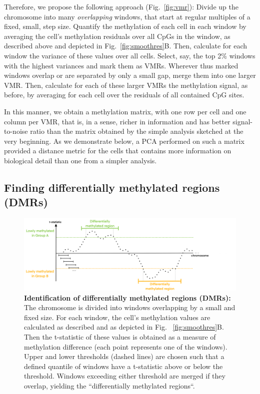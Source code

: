 \documentclass[twocolumn,10pt]{article}
\begin{document}
Therefore, we propose the following approach (Fig.~\ref{fig:vmr}): Divide up the chromosome into many \emph{overlapping} windows, that start at regular multiples of a fixed, small, step size.
Quantify the methylation of each cell in each window by averaging the cell's methylation residuals over all CpGs in the window, as described above and depicted in Fig.~\ref{fig:smoothres}B.
Then, calculate for each window the variance of these values over all cells.
Select, say, the top 2\% windows with the highest variances and mark them as VMRs.
Wherever thus marked windows overlap or are separated by only a small gap, merge them into one larger VMR.
Then, calculate for each of these larger VMRs the methylation signal, as before, by averaging for each cell over the residuals of all contained CpG sites.

In this manner, we obtain a methylation matrix, with one row per cell and one column per VMR, that is, in a sense, richer in information and has better signal-to-noise ratio than the matrix obtained by the simple analysis sketched at the very beginning.
As we demonstrate below, a PCA performed on such a matrix provided a distance metric for the cells that contains more information on biological detail than one from a simpler analysis.

\subsection{Finding differentially methylated regions (DMRs)}

\begin{figure}
    \includegraphics[width=\columnwidth]{figures/Fig_DMRdetection.png}
    \caption{\small \textbf{Identification of differentially methylated regions (DMRs):}
    The chromosome is divided into windows overlapping by a small and fixed size.
    For each window, the cell’s methylation values are calculated as described and as depicted in Fig.~ \ref{fig:smoothres}B.
    Then the t-statistic of these values is obtained as a measure of methylation difference (each point represents one of the windows).
    Upper and lower thresholds (dashed lines) are chosen such that a defined quantile of windows have a t-statistic above or below the threshold.
    Windows exceeding either threshold are merged if they overlap, yielding the ``differentially methylated regions``.}
    \label{fig:dmrscan}
\end{figure}
\end{document}
